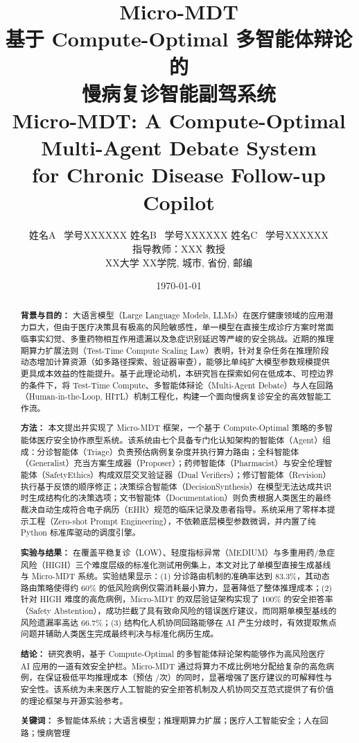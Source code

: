 \documentclass[11pt,a4paper]{ctexart}
\title{{\Huge \textbf{Micro-MDT}}\\[10pt]
       {\Large 基于 Compute-Optimal 多智能体辩论的}\\[6pt]
       {\Large 慢病复诊智能副驾系统}\\[16pt]
       {\normalsize Micro-MDT: A Compute-Optimal Multi-Agent Debate System}\\[4pt]
       {\normalsize for Chronic Disease Follow-up Copilot}}
\author{
    姓名A \ 学号XXXXXX \quad 
    姓名B \ 学号XXXXXX \quad 
    姓名C \ 学号XXXXXX \\[6pt]
    \small 指导教师：XXX 教授 \\[2pt]
    \small XX大学 XX学院, 城市, 省份, 邮编
}
\date{\today}
\begin{document}
\maketitle
\thispagestyle{empty}

\begin{abstract}
\noindent \textbf{背景与目的：} 大语言模型（Large Language Models, LLMs）在医疗健康领域的应用潜力巨大，但由于医疗决策具有极高的风险敏感性，单一模型在直接生成诊疗方案时常面临事实幻觉、多重药物相互作用遗漏以及急症识别延迟等严峻的安全挑战。近期的推理期算力扩展法则（Test-Time Compute Scaling Law）表明，针对复杂任务在推理阶段动态增加计算资源（如多路径探索、验证器审查），能够比单纯扩大模型参数规模提供更具成本效益的性能提升。基于此理论动机，本研究旨在探索如何在低成本、可控边界的条件下，将 Test-Time Compute、多智能体辩论（Multi-Agent Debate）与人在回路（Human-in-the-Loop, HITL）机制工程化，构建一个面向慢病复诊安全的高效智能工作流。

\noindent \textbf{方法：} 本文提出并实现了 Micro-MDT 框架，一个基于 Compute-Optimal 策略的多智能体医疗安全协作原型系统。该系统由七个具备专门化认知架构的智能体（Agent）组成：分诊智能体（Triage）负责预估病例复杂度并执行算力路由；全科智能体（Generalist）充当方案生成器（Proposer）；药师智能体（Pharmacist）与安全伦理智能体（SafetyEthics）构成双层交叉验证器（Dual Verifiers）；修订智能体（Revision）执行基于反馈的顺序修正；决策综合智能体（DecisionSynthesis）在模型无法达成共识时生成结构化的决策选项；文书智能体（Documentation）则负责根据人类医生的最终裁决自动生成符合电子病历（EHR）规范的临床记录及患者指导。系统采用了零样本提示工程（Zero-shot Prompt Engineering），不依赖底层模型参数微调，并内置了纯 Python 标准库驱动的调度引擎。

\noindent \textbf{实验与结果：} 在覆盖平稳复诊（LOW）、轻度指标异常（MEDIUM）与多重用药/急症风险（HIGH）三个难度层级的标准化测试用例集上，本文对比了单模型直接生成基线与 Micro-MDT 系统。实验结果显示：(1) 分诊路由机制的准确率达到 83.3\%，其动态路由策略使得约 60\% 的低风险病例仅需消耗最小算力，显著降低了整体推理成本；(2) 针对 HIGH 难度的高危病例，Micro-MDT 的双层验证架构实现了 100\% 的安全拒答率（Safety Abstention），成功拦截了具有致命风险的错误医疗建议，而同期单模型基线的风险遗漏率高达 66.7\%；(3) 结构化人机协同回路能够在 AI 产生分歧时，有效提取焦点问题并辅助人类医生完成最终判决与标准化病历生成。

\noindent \textbf{结论：} 研究表明，基于 Compute-Optimal 的多智能体辩论架构能够作为高风险医疗 AI 应用的一道有效安全护栏。Micro-MDT 通过将算力不成比例地分配给复杂的高危病例，在保证极低平均推理成本（预估 /次）的同时，显著增强了医疗建议的可解释性与安全性。该系统为未来医疗人工智能的安全拒答机制及人机协同交互范式提供了有价值的理论框架与开源实验参考。

\vspace{1em}
\noindent \textbf{关键词：} 多智能体系统；大语言模型；推理期算力扩展；医疗人工智能安全；人在回路；慢病管理
\end{abstract}
\end{document}
